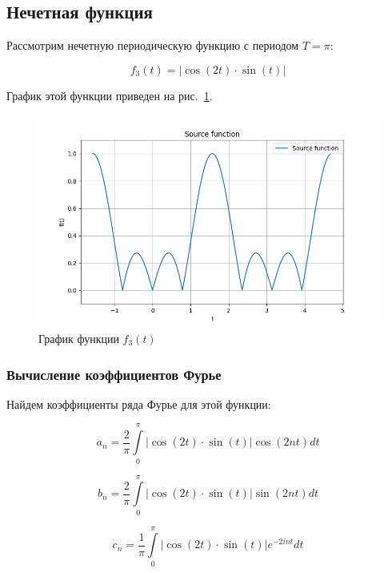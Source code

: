 \subsection{Нечетная функция}

Рассмотрим нечетную периодическую функцию с периодом $T = \pi$:

\begin{equation}
    f_3(t) = |\cos(2t) \cdot \sin(t)|
\end{equation}

График этой функции приведен на рис.~\ref{fig:func_3}.

\begin{figure}[ht!]
    \centering
    \includegraphics[width=\textwidth]{media/plots/func_3.png}
    \caption{График функции $f_3(t)$}
    \label{fig:func_3}
\end{figure}

\subsubsection{Вычисление коэффициентов Фурье}
Найдем коэффициенты ряда Фурье для этой функции:

\begin{equation}
    a_n = \frac{2}{\pi}\int\limits_{0}^{\pi} |\cos(2t) \cdot \sin(t)| \cos(2nt) dt 
\end{equation}

\begin{equation}
    b_n = \frac{2}{\pi}\int\limits_{0}^{\pi} |\cos(2t) \cdot \sin(t)| \sin(2nt) dt 
\end{equation}

\begin{equation}
    c_n = \frac{1}{\pi}\int\limits_{0}^{\pi} |\cos(2t) \cdot \sin(t)| e^{-2int} dt 
\end{equation}


